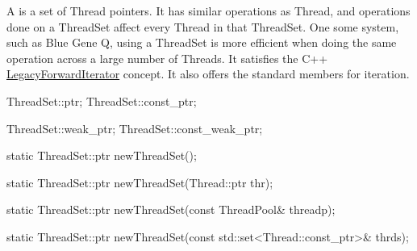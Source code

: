 
A  is a set of Thread pointers. It has similar
operations as Thread, and operations done on a ThreadSet affect every Thread in
that ThreadSet. One some system, such as Blue Gene Q, using a ThreadSet is
more efficient when doing the same operation across a large number of Threads.
It satisfies the C++
\href{https://en.cppreference.com/cpp/named_req/ForwardIterator}{LegacyForwardIterator}
concept. It also offers the standard  members for iteration.

\begin{apient}
ThreadSet::ptr;
ThreadSet::const_ptr;
\end{apient}


\begin{apient}
ThreadSet::weak_ptr;
ThreadSet::const_weak_ptr;
\end{apient}


\begin{apient}
static ThreadSet::ptr newThreadSet();
\end{apient}


\begin{apient}
static ThreadSet::ptr newThreadSet(Thread::ptr thr);
\end{apient}


\begin{apient}
static ThreadSet::ptr newThreadSet(const ThreadPool& threadp);
\end{apient}


\begin{apient}
static ThreadSet::ptr newThreadSet(const std::set<Thread::const_ptr>& thrds);
\end{apient}

